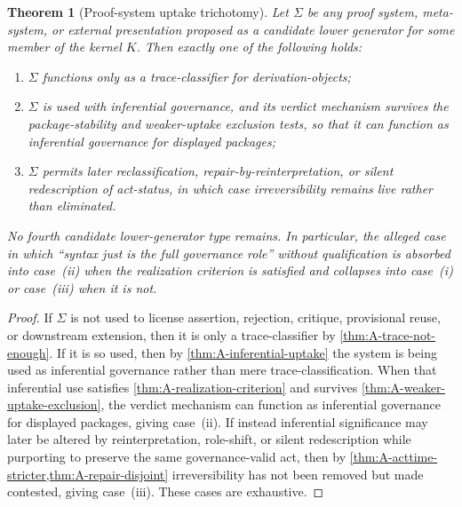 \documentclass[11pt]{article}
\theoremstyle{plain}
\newtheorem{theorem}{Theorem}[section]
\theoremstyle{definition}
\begin{document}
\begin{theorem}[Proof-system uptake trichotomy]
\label{thm:A-proofsystem-trichotomy}
Let $\Sigma$ be any proof system, meta-system, or external presentation proposed as a candidate
lower generator for some member of the kernel $K$. Then exactly one of the following holds:
\begin{enumerate}[label=(\roman*), leftmargin=2.5em]
    \item $\Sigma$ functions only as a trace-classifier for derivation-objects;
    \item $\Sigma$ is used with inferential governance, and its verdict mechanism survives the package-stability and weaker-uptake exclusion tests, so that it can function as inferential governance for displayed packages;
    \item $\Sigma$ permits later reclassification, repair-by-reinterpretation, or silent redescription of act-status, in which case irreversibility remains live rather than eliminated.
\end{enumerate}
No fourth candidate lower-generator type remains. In particular, the alleged case in which ``syntax just is the full governance role'' without qualification is absorbed into case~(ii) when the realization criterion is satisfied and collapses into case~(i) or case~(iii) when it is not.
\end{theorem}

\begin{proof}
If $\Sigma$ is not used to license assertion, rejection, critique, provisional reuse, or downstream extension, then it is only a trace-classifier by \cref{thm:A-trace-not-enough}. If it is so used, then by \cref{thm:A-inferential-uptake} the system is being used as inferential governance rather than mere trace-classification. When that inferential use satisfies \cref{thm:A-realization-criterion} and survives \cref{thm:A-weaker-uptake-exclusion}, the verdict mechanism can function as inferential governance for displayed packages, giving case~(ii). If instead inferential significance may later be altered by reinterpretation, role-shift, or silent redescription while purporting to preserve the same governance-valid act, then by \cref{thm:A-acttime-stricter,thm:A-repair-disjoint} irreversibility has not been removed but made contested, giving case~(iii). These cases are exhaustive.
\end{proof}
\end{document}
